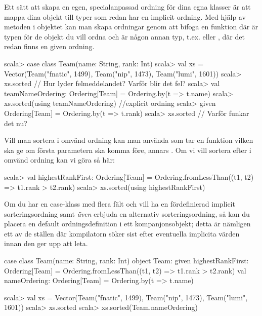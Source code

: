 \Subtask Ett sätt att skapa en egen, specialanpassad ordning för dina egna klasser är att mappa dina objekt till typer som redan har en implicit ordning. Med hjälp av metoden  i objektet  kan man skapa ordningar genom att bifoga en funktion  där  är typen för de objekt du vill ordna och  är någon annan typ, t.ex.  eller , där det redan finns en given ordning.
\begin{REPL}
scala> case class Team(name: String, rank: Int)
scala> val xs =
         Vector(Team("fnatic", 1499), Team("nip", 1473), Team("lumi", 1601))
scala> xs.sorted  // Hur lyder felmeddelandet? Varför blir det fel?
scala> val teamNameOrdering: Ordering[Team] = Ordering.by(t => t.name)
scala> xs.sorted(using teamNameOrdering)   //explicit ordning
scala> given Ordering[Team] = Ordering.by(t => t.rank)
scala> xs.sorted   // Varför funkar det nu?
\end{REPL}

\Subtask Vill man sortera i omvänd ordning kan man använda
 som tar en funktion  vilken ska ge  om första parametern ska komma före, annars . Om vi vill sortera efter  i omvänd ordning kan vi göra så här:
\begin{REPL}
scala> val highestRankFirst: Ordering[Team] =
         Ordering.fromLessThan((t1, t2) => t1.rank > t2.rank)
scala> xs.sorted(using highestRankFirst)
\end{REPL}

\Subtask Om du har en case-klass med flera fält och vill ha en fördefinierad implicit sorteringsordning samt \emph{även} erbjuda en alternativ sorteringsordning, så kan du placera en default ordningsdefinition i ett kompanjonsobjekt; detta är nämligen ett av de ställen där kompilatorn söker sist efter eventuella implicita värden innan den ger upp att leta.
\begin{Code}
case class Team(name: String, rank: Int)
object Team:
  given highestRankFirst: Ordering[Team] = 
    Ordering.fromLessThan((t1, t2) => t1.rank > t2.rank)
  val nameOrdering: Ordering[Team] = Ordering.by(t => t.name)
\end{Code}
\begin{REPL}
scala> val xs =
         Vector(Team("fnatic", 1499), Team("nip", 1473), Team("lumi", 1601))
scala> xs.sorted
scala> xs.sorted(Team.nameOrdering)
\end{REPL}



